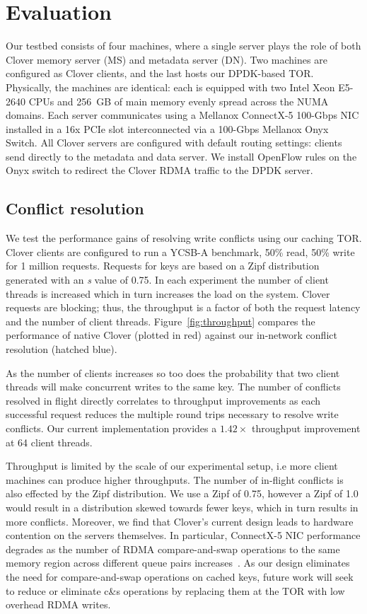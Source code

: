 \section{Evaluation}

Our testbed consists of four machines, where a single
server plays the role of both Clover memory server (MS) and metadata
server (DN).  Two machines are configured as Clover clients, and the
last hosts our DPDK-based TOR.  Physically, the machines
are identical: each is equipped with two Intel Xeon E5-2640 CPUs and
256~GB of main memory evenly spread across the NUMA domains. Each
server communicates using a Mellanox ConnectX-5 100-Gbps NIC installed
in a 16x PCIe slot interconnected via a 100-Gbps Mellanox Onyx Switch.
All Clover servers are configured with default routing settings:
clients send directly to the metadata and data server.  We install
OpenFlow rules on the Onyx switch to redirect the Clover RDMA traffic
to the DPDK server.

\subsection{Conflict resolution}

We test the performance gains of resolving write conflicts using our
caching TOR. Clover clients are configured to run a YCSB-A benchmark,
50\% read, 50\% write for 1 million requests. Requests for keys are
based on a Zipf distribution generated with an \textit{s} value of
0.75.
In each experiment the
number of client threads is increased which in turn increases the load
on the system. Clover requests are blocking; thus, the throughput is a
factor of both the request latency and the number of client
threads. Figure~\ref{fig:throughput} compares the performance of
native Clover (plotted in red) against our in-network conflict
resolution (hatched blue).

As the number of clients increases so too does the probability that
two client threads will make concurrent writes to the same key. The
number of conflicts resolved in flight directly correlates to
throughput improvements as each successful request reduces the
multiple round trips necessary to resolve write conflicts. Our current
implementation provides a $1.42\times$ throughput improvement at 64
client threads.

Throughput is limited by the scale of our experimental setup, i.e more
client machines can produce higher throughputs.  
%
%
  The number of in-flight conflicts
is also effected by the Zipf distribution. We use a Zipf of 0.75,
however a Zipf of 1.0 would result in a distribution skewed towards
fewer keys, which in turn results in more conflicts. Moreover, we find
that Clover's current design leads to hardware contention on the
servers themselves.  In particular, ConnectX-5 NIC performance
degrades as the number of RDMA compare-and-swap operations to the same
memory region across different queue pairs
increases~\cite{design-guidelines}. As our design eliminates the need
for compare-and-swap operations on cached keys, future work will seek
to reduce or eliminate c\&s operations by replacing them at the TOR
with low overhead RDMA writes.

